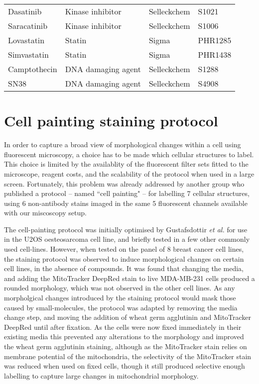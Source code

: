 \documentclass[a4paper,11pt,twoside,openright]{scrbook}
\begin{document}
\begin{table}[]
\begin{footnotesize}
\begin{tabular}{@{}llll@{}}
    Dasatinib       & Kinase inhibitor       & Selleckchem & S1021       \\
    Saracatinib     & Kinase inhibitor       & Selleckchem & S1006       \\
    Lovastatin      & Statin                 & Sigma       & PHR1285     \\
    Simvastatin     & Statin                 & Sigma       & PHR1438     \\
    Camptothecin    & DNA damaging agent     & Selleckchem & S1288       \\
    SN38            & DNA damaging agent     & Selleckchem & S4908       \\ \bottomrule
    \end{tabular}
    \end{footnotesize}
\end{table}




\section{Cell painting staining protocol}

In order to capture a broad view of morphological changes within a cell using fluorescent microscopy, a choice has to be made which cellular structures to label.
This choice is limited by the availablity of the fluorescent filter sets fitted to the microscope, reagent costs, and the scalability of the protocol when used in a large screen.
Fortunately, this problem was already addressed by another group who published a protocol -- named ``cell painting" -- for labelling 7 cellular structures, using 6 non-antibody stains imaged in the same 5 fluorescent channels available with our miscoscopy setup. \cite{Gustafsdottir2013, Bray2016}

The cell-painting protocol was initially optimised by Gustafsdottir \textit{et al.} for use in the U2OS oesteosarcoma cell line, and briefly tested in a few other commonly used cell-lines.
However, when tested on the panel of 8 breast cancer cell lines, the staining protocol was observed to induce morphological changes on certain cell lines, in the absence of compounds.
It was found that changing the media, and adding the MitoTracker DeepRed stain to live MDA-MB-231 cells produced a rounded morphology, which was not observed in the other cell lines.  %
As any morpholgical changes introduced by the staining protocol would mask those caused by small-molecules, the protocol was adapted by removing the media change step, and moving the addition of wheat germ agglutinin and MitoTracker DeepRed until after fixation.
As the cells were now fixed immediately in their existing media this prevented any alterations to the morphology and improved the wheat germ agglutinin staining, although as the MitoTracker stain relies on membrane potential of the mitochondria, the selectivity of the MitoTracker stain was reduced when used on fixed cells, though it still produced selective enough labelling to capture large changes in mitochondrial morphology.
\end{document}
